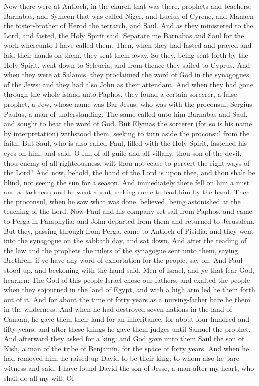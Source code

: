 Now there were at Antioch, in the church that was there, prophets and teachers, Barnabas, and Symeon that was called Niger, and Lucius of Cyrene, and Manaen the foster-brother of Herod the tetrarch, and Saul. And as they ministered to the Lord, and fasted, the Holy Spirit said, Separate me Barnabas and Saul for the work whereunto I have called them. Then, when they had fasted and prayed and laid their hands on them, they sent them away.  So they, being sent forth by the Holy Spirit, went down to Seleucia; and from thence they sailed to Cyprus. And when they were at Salamis, they proclaimed the word of God in the synagogues of the Jews: and they had also John as their attendant. And when they had gone through the whole island unto Paphos, they found a certain sorcerer, a false prophet, a Jew, whose name was Bar-Jesus; who was with the proconsul, Sergius Paulus, a man of understanding. The same called unto him Barnabas and Saul, and sought to hear the word of God. But Elymas the sorcerer (for so is his name by interpretation) withstood them, seeking to turn aside the proconsul from the faith. But Saul, who is also called Paul, filled with the Holy Spirit, fastened his eyes on him, and said, O full of all guile and all villany, thou son of the devil, thou enemy of all righteousness, wilt thou not cease to pervert the right ways of the Lord? And now, behold, the hand of the Lord is upon thee, and thou shalt be blind, not seeing the sun for a season. And immediately there fell on him a mist and a darkness; and he went about seeking some to lead him by the hand. Then the proconsul, when he saw what was done, believed, being astonished at the teaching of the Lord.  Now Paul and his company set sail from Paphos, and came to Perga in Pamphylia: and John departed from them and returned to Jerusalem. But they, passing through from Perga, came to Antioch of Pisidia; and they went into the synagogue on the sabbath day, and sat down. And after the reading of the law and the prophets the rulers of the synagogue sent unto them, saying, Brethren, if ye have any word of exhortation for the people, say on. And Paul stood up, and beckoning with the hand said, Men of Israel, and ye that fear God, hearken: The God of this people Israel chose our fathers, and exalted the people when they sojourned in the land of Egypt, and with a high arm led he them forth out of it. And for about the time of forty years as a nursing-father bare he them in the wilderness. And when he had destroyed seven nations in the land of Canaan, he gave them their land for an inheritance, for about four hundred and fifty years: and after these things he gave them judges until Samuel the prophet. And afterward they asked for a king: and God gave unto them Saul the son of Kish, a man of the tribe of Benjamin, for the space of forty years. And when he had removed him, he raised up David to be their king; to whom also he bare witness and said, I have found David the son of Jesse, a man after my heart, who shall do all my will. Of 